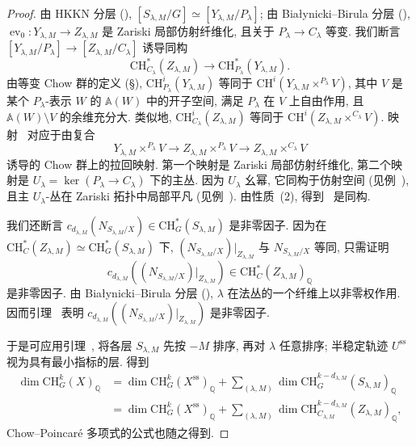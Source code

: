 \begin{proof}
由 HKKN 分层 (), $[S_{\lambda,M}/G]\simeq[Y_{\lambda,M}/P_\lambda]$; 由 Białynicki--Birula 分层 (), $\operatorname{ev}_0:Y_{\lambda,M}\to Z_{\lambda,M}$ 是 Zariski 局部仿射纤维化, 且关于 $P_\lambda\to C_\lambda$ 等变. 我们断言 $[Y_{\lambda,M}/P_\lambda]\to[Z_{\lambda,M}/C_\lambda]$ 诱导同构
\begin{equation}\label{src:8.7.14}
\mathrm{CH}_{C_\lambda}^*(Z_{\lambda,M})\longrightarrow\mathrm{CH}_{P_\lambda}^*(Y_{\lambda,M}).
\end{equation}
由等变 Chow 群的定义 (\S{}), $\mathrm{CH}_{P_\lambda}^i(Y_{\lambda,M})$ 等同于 $\mathrm{CH}^i(Y_{\lambda,M}\times^{P_\lambda}V)$, 其中 $V$ 是某个 $P_\lambda$-表示 $W$ 的 $\mathbb A(W)$ 中的开子空间, 满足 $P_\lambda$ 在 $V$ 上自由作用, 且 $\mathbb A(W)\setminus V$ 的余维充分大. 类似地, $\mathrm{CH}_{C_\lambda}^i(Z_{\lambda,M})$ 等同于 $\mathrm{CH}^i(Z_{\lambda,M}\times^{C_\lambda}V)$. 映射~ 对应于由复合
\[
Y_{\lambda,M}\times^{P_\lambda}V\longrightarrow Z_{\lambda,M}\times^{P_\lambda}V\longrightarrow Z_{\lambda,M}\times^{C_\lambda}V
\]
诱导的 Chow 群上的拉回映射. 第一个映射是 Zariski 局部仿射纤维化, 第二个映射是 $U_\lambda=\ker(P_\lambda\to C_\lambda)$ 下的主丛. 因为 $U_\lambda$ 幺幂, 它同构于仿射空间 (见例~), 且主 $U_\lambda$-丛在 Zariski 拓扑中局部平凡 (见例~). 由性质~(2), 得到~ 是同构.

我们还断言 $c_{d_{\lambda,M}}(N_{S_{\lambda,M}/X})\in\mathrm{CH}_G^*(S_{\lambda,M})$ 是非零因子. 因为在 $\mathrm{CH}_C^*(Z_{\lambda,M})\simeq\mathrm{CH}_G^*(S_{\lambda,M})$ 下, $(N_{S_{\lambda,M}/X})|_{Z_{\lambda,M}}$ 与 $N_{S_{\lambda,M}/X}$ 等同, 只需证明
\[
c_{d_{\lambda,M}}((N_{S_{\lambda,M}/X})|_{Z_{\lambda,M}})\in\mathrm{CH}_C^*(Z_{\lambda,M})_{\mathbb Q}
\]
是非零因子. 由 Białynicki--Birula 分层 (), $\lambda$ 在法丛的一个纤维上以非零权作用. 因而引理~ 表明 $c_{d_{\lambda,M}}((N_{S_{\lambda,M}/X})|_{Z_{\lambda,M}})$ 是非零因子.

于是可应用引理~, 将各层 $S_{\lambda,M}$ 先按 $-M$ 排序, 再对 $\lambda$ 任意排序; 半稳定轨迹 $U^{\mathrm{ss}}$ 视为具有最小指标的层. 得到
\begin{align*}
\dim\mathrm{CH}_G^k(X)_{\mathbb Q}
&=\dim\mathrm{CH}_G^k(X^{\mathrm{ss}})_{\mathbb Q}+\sum_{(\lambda,M)}\dim\mathrm{CH}_G^{k-d_{\lambda,M}}(S_{\lambda,M})_{\mathbb Q}\\
&=\dim\mathrm{CH}_G^k(X^{\mathrm{ss}})_{\mathbb Q}+\sum_{(\lambda,M)}\dim\mathrm{CH}_{C_{\lambda,M}}^{k-d_{\lambda,M}}(Z_{\lambda,M})_{\mathbb Q},
\end{align*}
Chow--Poincaré 多项式的公式也随之得到.
\end{proof}
